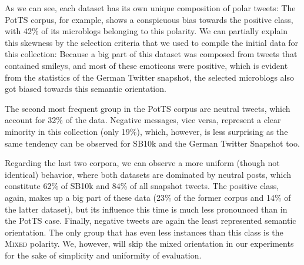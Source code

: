 As we can see, each dataset has its own unique composition of polar
tweets: The PotTS corpus, for example, shows a conspicuous bias
towards the positive class, with 42\% of its microblogs belonging to
this polarity.  We can partially explain this skewness by the
selection criteria that we used to compile the initial data for this
collection: Because a big part of this dataset was composed from
tweets that contained smileys, and most of these emoticons were
positive, which is evident from the statistics of the German Twitter
snapshot, the selected microblogs also got biased towards this
semantic orientation.

The second most frequent group in the PotTS corpus are neutral tweets,
which account for 32\% of the data.  Negative messages, vice versa,
represent a clear minority in this collection (only 19\%), which,
however, is less surprising as the same tendency can be observed for
SB10k and the German Twitter Snapshot too.

Regarding the last two corpora, we can observe a more uniform (though
not identical) behavior, where both datasets are dominated by neutral
posts, which constitute 62\% of SB10k and 84\% of all snapshot tweets.
The positive class, again, makes up a big part of these data (23\% of
the former corpus and 14\% of the latter dataset), but its influence
this time is much less pronounced than in the PotTS case.  Finally,
negative tweets are again the least represented semantic orientation.
The only group that has even less instances than this class is the
\textsc{Mixed} polarity.  We, however, will skip the mixed orientation
in our experiments for the sake of simplicity and uniformity of
evaluation.



